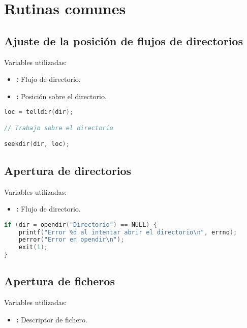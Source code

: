 \chapter{Rutinas comunes}

\section{Ajuste de la posición de flujos de directorios}

Variables utilizadas:

\begin{itemize}
	\item{}\textbf{:} Flujo de directorio.
	\item{}\textbf{:} Posición sobre el directorio.
\end{itemize}

\begin{lstlisting}[language=C]
loc = telldir(dir);

// Trabajo sobre el directorio

seekdir(dir, loc);
\end{lstlisting}

\section{Apertura de directorios}

Variables utilizadas:

\begin{itemize}
	\item{}\textbf{:} Flujo de directorio.
\end{itemize}

\begin{lstlisting}[language=C]
if (dir = opendir("Directorio") == NULL) {
	printf("Error %d al intentar abrir el directorio\n", errno);
	perror("Error en opendir\n");
	exit(1);
}
\end{lstlisting}

\section{Apertura de ficheros}

Variables utilizadas:

\begin{itemize}
	\item{}\textbf{:} Descriptor de fichero.
\end{itemize}

